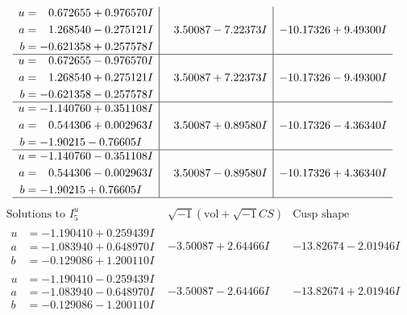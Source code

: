 \documentclass[1p]{elsarticle_modified}
\theoremstyle{definition}
\newcommand{\I}{\sqrt{-1}}
\begin{document}
$$\begin{array}{c|c|c}
\begin{aligned}
u &= \phantom{-}0.672655 + 0.976570 I \\
a &= \phantom{-}1.268540 - 0.275121 I \\
b &= -0.621358 + 0.257578 I\end{aligned}
 & \phantom{-}3.50087 - 7.22373 I & -10.17326 + 9.49300 I \\ \hline\begin{aligned}
u &= \phantom{-}0.672655 - 0.976570 I \\
a &= \phantom{-}1.268540 + 0.275121 I \\
b &= -0.621358 - 0.257578 I\end{aligned}
 & \phantom{-}3.50087 + 7.22373 I & -10.17326 - 9.49300 I \\ \hline\begin{aligned}
u &= -1.140760 + 0.351108 I \\
a &= \phantom{-}0.544306 + 0.002963 I \\
b &= -1.90215 - 0.76605 I\end{aligned}
 & \phantom{-}3.50087 + 0.89580 I & -10.17326 - 4.36340 I \\ \hline\begin{aligned}
u &= -1.140760 - 0.351108 I \\
a &= \phantom{-}0.544306 - 0.002963 I \\
b &= -1.90215 + 0.76605 I\end{aligned}
 & \phantom{-}3.50087 - 0.89580 I & -10.17326 + 4.36340 I\\
 \hline 
 \end{array}$$\newpage$$\begin{array}{c|c|c}  
\text{Solutions to }I^u_{5}& \I (\text{vol} + \sqrt{-1}CS) & \text{Cusp shape}\\
 \hline 
\begin{aligned}
u &= -1.190410 + 0.259439 I \\
a &= -1.083940 + 0.648970 I \\
b &= -0.129086 + 1.200110 I\end{aligned}
 & -3.50087 + 2.64466 I & -13.82674 - 2.01946 I \\ \hline\begin{aligned}
u &= -1.190410 - 0.259439 I \\
a &= -1.083940 - 0.648970 I \\
b &= -0.129086 - 1.200110 I\end{aligned}
 & -3.50087 - 2.64466 I & -13.82674 + 2.01946 I \\ \hline\begin{aligned}

\end{aligned}
\end{array}$$
\end{document}
